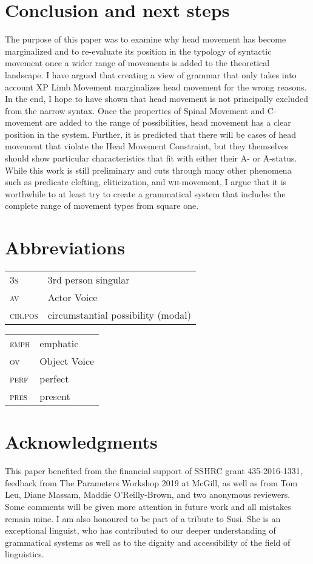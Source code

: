 \documentclass[output=paper,colorlinks,citecolor=brown,
]{langscibook}
\begin{document}
\section{Conclusion and next steps}

The purpose of this paper was to examine why head movement has become marginalized and to re-evaluate its position in the typology of syntactic movement once a wider range of movements is added to the theoretical landscape.  I have argued that creating a view of grammar that only takes into account XP Limb Movement marginalizes head movement for the wrong reasons.  In the end, I hope to have shown that head movement is not principally excluded from the narrow syntax.  Once the properties of Spinal Movement and C-movement are added to the range of possibilities, head movement has a clear position in the system.  Further, it is predicted that there will be cases of head movement that violate the Head Movement Constraint, but they themselves should show particular characteristics that fit with either their A- or \=A-status.  While this work is still preliminary and cuts through many other phenomena such as predicate clefting, cliticization, and \textsc{wh}-movement, I argue that it is worthwhile to at least try to create a grammatical system that includes the complete range of movement types from square one.

\section*{Abbreviations}
\begin{tabularx}{.5\textwidth}{@{}lQ}
\textsc{3s} & 3rd person singular\\
\textsc{av} & Actor Voice\\
\textsc{cir.pos} & circumstantial possibility (modal)   
\end{tabularx}\begin{tabularx}{.5\textwidth}{lQ@{}}
\textsc{emph} & emphatic\\
\textsc{ov} & Object Voice \\
\textsc{perf} & perfect \\
\textsc{pres} & present 
\end{tabularx}

\section*{Acknowledgments}
\begin{sloppypar}
This paper benefited from the financial support of SSHRC grant 435-2016-1331, feedback from The Parameters Workshop 2019 at McGill, as well as from Tom Leu, Diane Massam, Maddie O'Reilly-Brown, and two anonymous reviewers.  Some comments will be given more attention in future work and all mistakes remain mine.  I am also honoured to be part of a tribute to Susi.  She is an exceptional linguist, who has contributed to our deeper understanding of grammatical systems as well as to the dignity and accessibility of the field of linguistics.
\end{sloppypar}

\printbibliography[heading=subbibliography,notkeyword=this]
\end{document}
